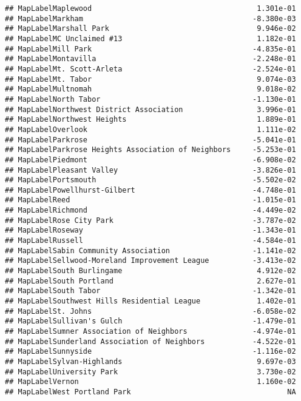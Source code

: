 \documentclass[]{article}
\begin{document}
\begin{verbatim}
## MapLabelMaplewood                                      1.301e-01
## MapLabelMarkham                                       -8.380e-03
## MapLabelMarshall Park                                  9.946e-02
## MapLabelMC Unclaimed #13                               1.182e-01
## MapLabelMill Park                                     -4.835e-01
## MapLabelMontavilla                                    -2.248e-01
## MapLabelMt. Scott-Arleta                              -2.524e-01
## MapLabelMt. Tabor                                      9.074e-03
## MapLabelMultnomah                                      9.018e-02
## MapLabelNorth Tabor                                   -1.130e-01
## MapLabelNorthwest District Association                 3.996e-01
## MapLabelNorthwest Heights                              1.889e-01
## MapLabelOverlook                                       1.111e-02
## MapLabelParkrose                                      -5.041e-01
## MapLabelParkrose Heights Association of Neighbors     -5.253e-01
## MapLabelPiedmont                                      -6.908e-02
## MapLabelPleasant Valley                               -3.826e-01
## MapLabelPortsmouth                                    -5.502e-02
## MapLabelPowellhurst-Gilbert                           -4.748e-01
## MapLabelReed                                          -1.015e-01
## MapLabelRichmond                                      -4.449e-02
## MapLabelRose City Park                                -3.787e-02
## MapLabelRoseway                                       -1.343e-01
## MapLabelRussell                                       -4.584e-01
## MapLabelSabin Community Association                   -1.141e-02
## MapLabelSellwood-Moreland Improvement League          -3.413e-02
## MapLabelSouth Burlingame                               4.912e-02
## MapLabelSouth Portland                                 2.627e-01
## MapLabelSouth Tabor                                   -1.342e-01
## MapLabelSouthwest Hills Residential League             1.402e-01
## MapLabelSt. Johns                                     -6.058e-02
## MapLabelSullivan's Gulch                              -1.479e-01
## MapLabelSumner Association of Neighbors               -4.974e-01
## MapLabelSunderland Association of Neighbors           -4.522e-01
## MapLabelSunnyside                                     -1.116e-02
## MapLabelSylvan-Highlands                               9.697e-03
## MapLabelUniversity Park                                3.730e-02
## MapLabelVernon                                         1.160e-02
## MapLabelWest Portland Park                                    NA

\end{verbatim}
\end{document}
